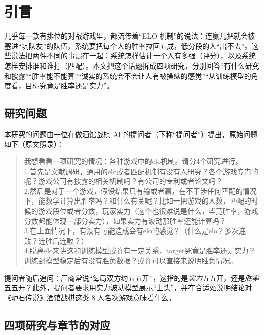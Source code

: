 \chapter*{引言}

几乎每一款有排位的对战游戏里，都流传着“ELO 机制”的说法：连赢几把就会被塞进“坑队友”的队伍，系统要把每个人的胜率拉回五成，低分段的人“出不去”。这些说法把两件不同的事混在一起：系统怎样估计一个人有多强（评分），以及系统怎样安排谁和谁打（匹配）。本文把这个话题拆成四项研究，分别回答“有什么研究和披露”“胜率能不能算”“诚实的系统会不会让人有被操纵的感觉”“从训练模型的角度看，目标究竟是胜率还是实力”。

\section*{研究问题}

本研究的问题由一位在做酒馆战棋 AI 的提问者（下称“提问者”）提出，原始问题如下（原文照录）：

\begin{quote}\small
我想看看一项研究的情况：各种游戏中的elo机制。请分4个研究进行。\\
1.首先是文献调研，通用的elo或者匹配机制有没有人研究？各个游戏专门的呢？游戏公司有披露的相关机制吗？有公司的专利或者论文吗？\\
2.然后是对于一个游戏，假设结果只有输或者赢，在不干涉任何匹配的情况下，能数学计算出胜率吗？和什么有关呢？比如一把游戏的人数，匹配的时候的游戏段位或者分数，玩家实力（这个也很难说是什么，毕竟胜率，游戏分数都能体现一部分实力），如果实力有波动那胜率还能计算吗？\\
3.在上面情况下，有没有可能造成会有elo的感觉？（什么是elo？多次连败？连胜后连败？）\\
4.脱离elo来讲这和训练模型或许有一定关系，target究竟是胜率还是实力？训练到模型稳定后有没有胜负数据？或许可以直接来说明胜负情况。
\end{quote}

提问者随后追问：厂商常说“每局双方约五五开”，这指的是\emph{实力}五五开，还是\emph{胜率}五五开？此外，提问者要求用实力波动模型展示“上头”，并在合适处说明结论对《炉石传说》酒馆战棋这类 8 人名次游戏意味着什么。

\section*{四项研究与章节的对应}

